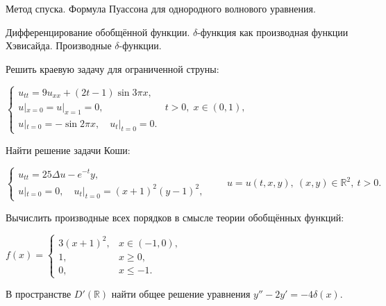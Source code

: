
\begin{cond}
	Метод спуска. Формула Пуассона для однородного волнового уравнения.
\end{cond}

\begin{cond}
	Дифференцирование обобщённой функции. $\delta$-функция как производная функции Хэвисайда. Производные $\delta$-функции.
\end{cond}

\begin{cond}
	Решить краевую задачу для ограниченной струны:

	\(
	\begin{cases}
		u_{tt} = 9u_{xx} + (2t - 1)\sin 3\pi x,          \\
		u|_{x=0} = u|_{x=1} = 0, & t > 0,\; x \in (0,1), \\
		u|_{t=0} = -\sin 2\pi x,\quad u_t|_{t=0} = 0.
	\end{cases}
	\)
\end{cond}

\begin{cond}
	Найти решение задачи Коши:

	\(
	\begin{cases}
		u_{tt} = 25\Delta u - e^{-t}y, \\
		u|_{t=0} = 0,\quad u_t|_{t=0} = (x+1)^2 (y-1)^2,
	\end{cases}
	\qquad
	u = u(t,x,y),\ (x,y)\in\mathbb{R}^2,\ t>0.
	\)
\end{cond}

\begin{cond}
	Вычислить производные всех порядков в смысле теории обобщённых функций:

	\(
	f(x) =
	\begin{cases}
		3(x+1)^2, & x \in (-1,0), \\
		1,        & x \ge 0,      \\
		0,        & x \le -1.
	\end{cases}
	\)
\end{cond}

\begin{cond}
	В пространстве \(D'(\mathbb{R})\) найти общее решение уравнения
	$y'' - 2y' = -4\delta(x)$.
\end{cond}
